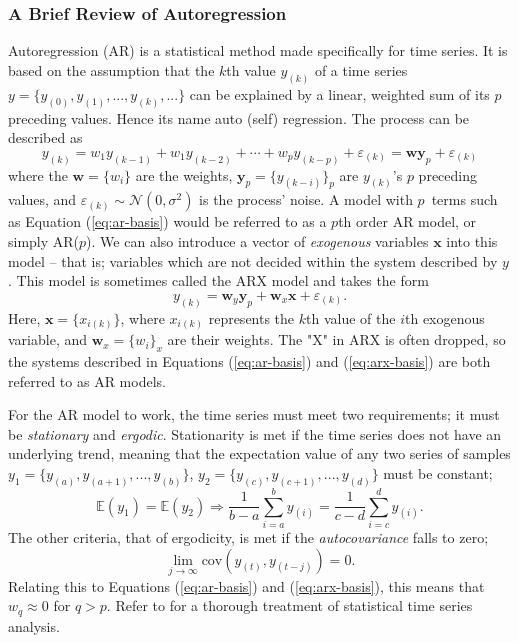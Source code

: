 \documentclass[]{article}
\begin{document}
\subsubsection{A Brief Review of Autoregression} \label{sec:ar-review}
Autoregression (AR) is a statistical method made specifically for time series. It is based on the assumption that the $k$th value $y_{(k)}$ of a time series $y = \{y_{(0)}, y_{(1)}, ..., y_{(k)}, ...\}$ can be explained by a linear, weighted sum of its $p$ preceding values. Hence its name auto (self) regression. The process can be described as
\begin{equation} \label{eq:ar-basis}
	y_{(k)} = w_1 y_{(k-1)} + w_1 y_{(k-2)} + \cdots + w_p y_{(k-p)} + \varepsilon_{(k)} = \mathbf{w} \mathbf{y}_p + \varepsilon_{(k)}
\end{equation}
where the $\mathbf{w} = \{w_{i}\}$ are the weights, $\mathbf{y}_p = \{y_{(k-i)}\}_p$ are $y_{(k)}$'s $p$ preceding values, and $\varepsilon_{(k)} \sim \mathcal{N}(0,\sigma^2)$ is the process' noise. A model with $p$ terms such as Equation (\ref{eq:ar-basis}) would be referred to as a $p$th order AR model, or simply AR($p$). We can also introduce a vector of \textit{exogenous} variables $\mathbf{x}$ into this model -- that is; variables which are not decided within the system described by $y$. This model is sometimes called the ARX model and takes the form
\begin{equation} \label{eq:arx-basis}
	y_{(k)} = \mathbf{w}_y \mathbf{y}_p + \mathbf{w}_x \mathbf{x} + \varepsilon_{(k)}.
\end{equation}
Here, $\mathbf{x} = \{x_{i(k)}\}$, where $x_{i(k)}$ represents the $k$th value of the $i$th exogenous variable, and $\mathbf{w}_x = \{w_i\}_x$ are their weights. The "X" in ARX is often dropped, so the systems described in Equations (\ref{eq:ar-basis}) and (\ref{eq:arx-basis}) are both referred to as AR models. 

For the AR model to work, the time series must meet two requirements; it must be \textit{stationary} and \textit{ergodic}. Stationarity is met if the time series does not have an underlying trend, meaning that the expectation value of any two series of samples $y_1 = \{y_{(a)}, y_{(a+1)}, ..., y_{(b)}\}$, $y_2 = \{y_{(c)}, y_{(c+1)}, ..., y_{(d)}\}$ must be constant;
\begin{equation}
	\mathbb{E}(y_1) = \mathbb{E}(y_2) \Rightarrow \frac{1}{b-a} \sum_{i=a}^{b} y_{(i)} = \frac{1}{c-d} \sum_{i=c}^{d} y_{(i)}.
\end{equation}
The other criteria, that of ergodicity, is met if the \textit{autocovariance} falls to zero;
\begin{equation}
	\lim\limits_{j \rightarrow \infty} \mathrm{cov}(y_{(t)}, y_{(t-j)}) = 0.
\end{equation}
Relating this to Equations (\ref{eq:ar-basis}) and (\ref{eq:arx-basis}), this means that $w_q \approx 0$ for $q > p$. Refer to \cite{shumway2017} for a thorough treatment of statistical time series analysis.
\end{document}
